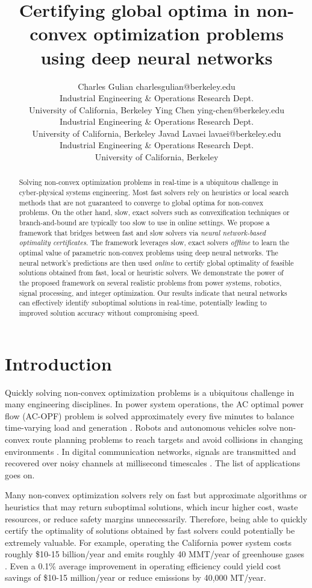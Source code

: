 \documentclass[10pt]{article} %
\title{Certifying global optima in non-convex optimization problems using deep neural networks}
\author{\name Charles Gulian \email charlesgulian@berkeley.edu \\
      \addr Industrial Engineering \& Operations Research Dept.\\
      University of California, Berkeley
      \AND
      \name Ying Chen \email ying-chen@berkeley.edu \\
      \addr Industrial Engineering \& Operations Research Dept.\\
      University of California, Berkeley
      \AND
      \name Javad Lavaei \email lavaei@berkeley.edu\\
      \addr Industrial Engineering \& Operations Research Dept.\\
      University of California, Berkeley}
\theoremstyle{plain}
\theoremstyle{definition}
\theoremstyle{remark}
\begin{document}
\maketitle

\begin{abstract}
Solving non-convex optimization problems in real-time is a ubiquitous challenge in cyber-physical systems engineering. 
Most fast solvers rely on heuristics or local search methods that are not guaranteed to converge to global optima for non-convex problems.
On the other hand, slow, exact solvers such as convexification techniques or branch-and-bound are typically too slow to use in online settings. 
We propose a framework that bridges between fast and slow solvers via \textit{neural network-based optimality certificates}. 
The framework leverages slow, exact solvers \textit{offline} to learn the optimal value of parametric non-convex problems using deep neural networks. 
The neural network's predictions are then used \textit{online} to certify global optimality of feasible solutions obtained from fast, local or heuristic solvers. 
We demonstrate the power of the proposed framework on several realistic problems from power systems, robotics, signal processing, and integer optimization. Our results indicate that neural networks can effectively identify suboptimal solutions in real-time, potentially leading to improved solution accuracy without compromising speed.
\end{abstract}

\section{Introduction}

Quickly solving non-convex optimization problems is a ubiquitous challenge in many engineering disciplines. 
In power system operations, the AC optimal power flow (AC-OPF) problem is solved approximately every five minutes to balance time-varying load and generation \citep{van2021machine}.
Robots and autonomous vehicles solve non-convex route planning problems to reach targets and avoid collisions in changing environments \citep{ahmadi2016some}. 
In digital communication networks, signals are transmitted and recovered over noisy channels at millisecond timescales \citep{samuel2017deep}. 
The list of applications goes on.

Many non-convex optimization solvers rely on fast but approximate algorithms or heuristics that may return suboptimal solutions, which incur higher cost, waste resources, or reduce safety margins unnecessarily. Therefore, being able to quickly certify the optimality of solutions obtained by fast solvers could potentially be extremely valuable. For example, operating the California power system costs roughly \$10-15 billion/year and emits roughly 40 MMT/year of greenhouse gases \citep{CAISO_DMM_2023}. Even a 0.1\% average improvement in operating efficiency could yield cost savings of \$10-15 million/year or reduce emissions by 40,000 MT/year.
\end{document}
